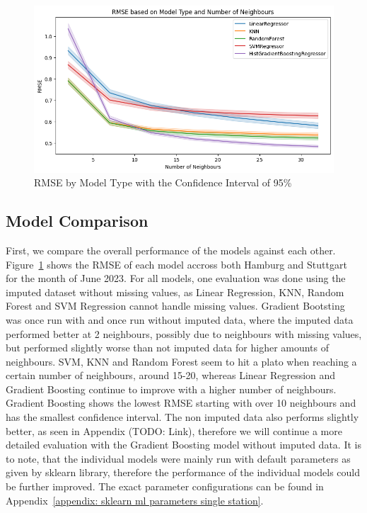 \begin{figure}[ht]
  \centering
  \includegraphics[width=1\textwidth]{images/rmse_by_model_type.png}
  \caption{RMSE by Model Type with the Confidence Interval of 95\%}
  \label{fig:rmse by model type}
\end{figure}

\subsection{Model Comparison}

First, we compare the overall performance of the models against each other. Figure~\ref{fig:rmse by model type} shows the RMSE of each model accross both Hamburg and Stuttgart for the month of June 2023. For all models, one evaluation was done using the imputed dataset without missing values, as Linear Regression, KNN, Random Forest and SVM Regression cannot handle missing values. Gradient Bootsting was once run with and once run without imputed data, where the imputed data performed better at 2 neighbours, possibly due to neighbours with missing values, but performed slightly worse than not imputed data for higher amounts of neighbours. SVM, KNN and Random Forest seem to hit a plato when reaching a certain number of neighbours, around 15-20, whereas Linear Regression and Gradient Boosting continue to improve with a higher number of neighbours.\\
Gradient Boosting shows the lowest RMSE starting with over 10 neighbours and has the smallest confidence interval. The non imputed data also performs slightly better, as seen in Appendix (TODO: Link), therefore we will continue a more detailed evaluation with the Gradient Boosting model without imputed data. It is to note, that the individual models were mainly run with default parameters as given by sklearn library, therefore the performance of the individual models could be further improved. The exact parameter configurations can be found in Appendix~\ref{appendix: sklearn ml parameters single station}.

